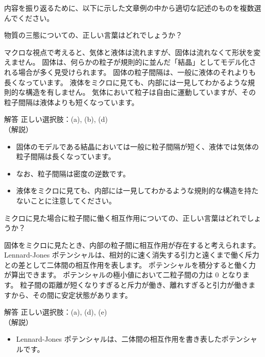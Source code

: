 \documentclass[uplatex,dvipdfmx,a4paper,11pt]{jsarticle}
\begin{document}
内容を振り返るために、以下に示した文章例の中から適切な記述のものを複数選んでください。
\begin{qlist}
	\qitem 物質の三態についての、正しい言葉はどれでしょうか？
		\begin{qlist2}
			\qitem マクロな視点で考えると、気体と液体は流れますが、固体は流れなくて形状を変えません。
			\qitem 固体は、何らかの粒子が規則的に並んだ「結晶」としてモデル化される場合が多く見受けられます。
			\qitem 固体の粒子間隔は、一般に液体のそれよりも長くなっています。
			\qitem 液体をミクロに見ても、内部には一見してわかるような規則的な構造を有しません。
			\qitem 気体において粒子は自由に運動していますが、その粒子間隔は液体よりも短くなっています。
		\end{qlist2}
        \vspace{3mm}
        \begin{itembox}[l]{解答}
            正しい選択肢：(a), (b), (d)\\
            （解説）
			\begin{itemize}
				\item 固体のモデルである結晶においては一般に粒子間隔が短く、液体では気体の粒子間隔は長くなっています。
				\item なお、粒子間隔は密度の逆数です。
				\item 液体をミクロに見ても、内部には一見してわかるような規則的な構造を持たないことに注意してください。
			\end{itemize}
        \end{itembox}
	\qitem ミクロに見た場合に粒子間に働く相互作用についての、正しい言葉はどれでしょうか？
		\begin{qlist2}
			\qitem 固体をミクロに見たとき、内部の粒子間に相互作用が存在すると考えられます。
			\qitem Lennard-Jones ポテンシャルは、相対的に速く消失する引力と遠くまで働く斥力との差として二体間の相互作用を表します。
			\qitem ポテンシャルを積分すると働く力が算出できます。
			\qitem ポテンシャルの極小値において二粒子間の力は 0 となります。
			\qitem 粒子間の距離が短くなりすぎると斥力が働き、離れすぎると引力が働きますから、その間に安定状態があります。
		\end{qlist2}
        \vspace{3mm}
        \begin{itembox}[l]{解答}
            正しい選択肢：(a), (d), (e)\\
            （解説）
			\begin{itemize}
				\item Lennard-Jones ポテンシャルは、二体間の相互作用を書き表したポテンシャルです。

\end{itemize}
\end{itembox}
\end{qlist}
\end{document}
